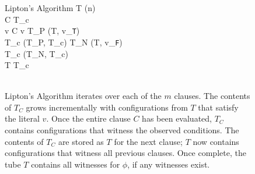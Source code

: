 


\begin{figure}[htbp]
\begin{center}
	\begin{pseudocode}{Lipton's Algorithm}{\phi}
	T \GETS {}(n) \\
	\FOREACH {} C  \phi \DO
		\BEGIN
		T_c \GETS \emptyset \\
		\FOREACH {} v  C \DO
			\BEGIN
				\IF v  \THEN
					\BEGIN
						T_P \GETS {}(T, v_{\texttt{T}})\\
						T_c \GETS {}(T_P, T_c)						
					\END
				\ELSE
					\BEGIN
						T_N \GETS {}(T, v_{\texttt{F}})\\
						T_c \GETS {}(T_N, T_c)						
					\END
			\END
		\\
		T \GETS {}T_c\text{)} \\
		\END
	\\
	\end{pseudocode}


\caption{{\sc Lipton's Algorithm} iterates over each of the $m$ clauses.  The contents of $T_C$ grows incrementally with configurations from $T$ that satisfy the literal $v$.  Once the entire clause $C$ has been evaluated, $T_C$ contains configurations that witness the observed conditions.  The contents of $T_C$ are stored as $T$ for the next clause; $T$ now contains configurations that witness all previous clauses.  Once complete, the tube $T$ contains all witnesses for $\phi$, if any witnesses exist.}
\label{liptonAlgorithm}
\end{center}
\end{figure}

